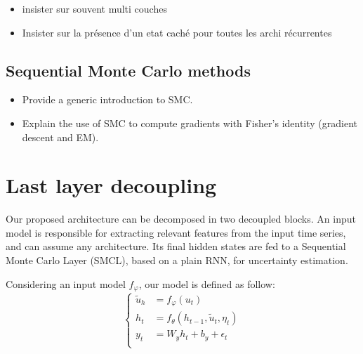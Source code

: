 \documentclass{article}
\begin{document}
\begin{itemize}
	\item insister sur souvent multi couches
	\item Insister sur la présence d'un etat caché pour toutes les archi récurrentes
\end{itemize}



\subsection{Sequential Monte Carlo methods}
\label{sec:background:smc}
\begin{itemize}
	\item Provide a generic introduction to SMC.
	\item Explain the use of SMC to compute gradients with Fisher's identity (gradient descent and EM).
\end{itemize}

\section{Last layer decoupling}
\label{sec:decoupling}
Our proposed architecture can be decomposed in two decoupled blocks.
An input model is responsible for extracting relevant features from the input time series, and can assume any architecture.
Its final hidden states are fed to a Sequential Monte Carlo Layer (SMCL), based on a plain RNN, for uncertainty estimation.

Considering an input model $f_\varphi$, our model is defined as follow:
\begin{equation*}
	\left\{
	\begin{aligned}
		\tilde u_h & = f_\varphi(u_t)                                     \\
		h_t        & = f_\theta(h_{t-1}, \tilde u_t, \eta_t) \\
		y_t        & = W_y h_t + b_y + \epsilon_t                         \\
	\end{aligned}
	\right.
\end{equation*}
\end{document}
